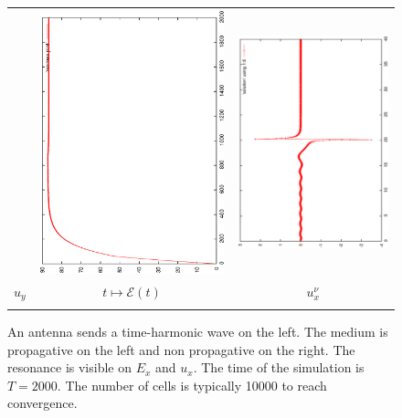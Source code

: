 \begin{figure}[h]
\begin{center}
\begin{tabular}{ccc}
			&
			\includegraphics[angle=-90,width=5.cm]{pics_semilagrange/normes_moit.eps}
			&
			\includegraphics[angle=-90,width=5.cm]{pics_semilagrange/ux_moit.eps}
			\\      
			$u_y$ & $t\mapsto \mathcal E(t)$ & $u_x^\nu$  \\
			
			\\
			
			
		\end{tabular}   \end{center}
		\caption{An antenna sends a time-harmonic wave on the left. The medium is propagative
			on the left and non propagative
			on the right. The resonance is visible on $E_x$ and $u_x$. The time of the simulation is $T=2000$. The number of cells
			is typically 10000 to reach convergence.}
		\label{fig:vasl}
	\end{figure}




